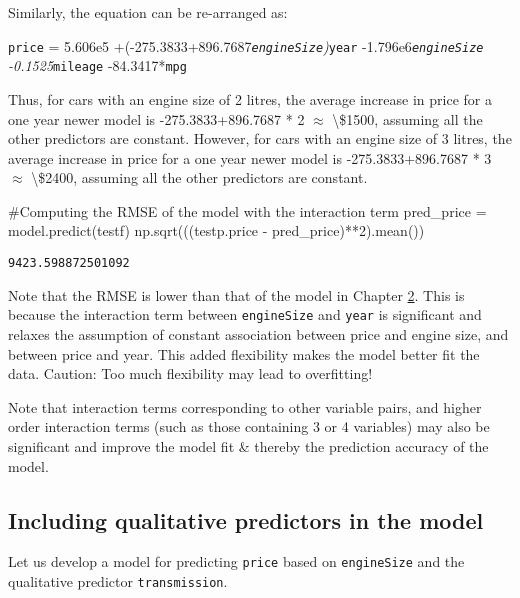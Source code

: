 \documentclass[
  letterpaper,
  DIV=11,
  numbers=noendperiod]{scrreprt}
\newenvironment{Shaded}{\begin{snugshade}}{\end{snugshade}}
\newcommand{\CommentTok}[1]{\textcolor[rgb]{0.37,0.37,0.37}{#1}}
\newcommand{\DecValTok}[1]{\textcolor[rgb]{0.68,0.00,0.00}{#1}}
\newcommand{\NormalTok}[1]{\textcolor[rgb]{0.00,0.23,0.31}{#1}}
\newcommand{\OperatorTok}[1]{\textcolor[rgb]{0.37,0.37,0.37}{#1}}
\begin{document}
Similarly, the equation can be re-arranged as:

\texttt{price} = 5.606e5
+(-275.3833+896.7687\emph{\texttt{engineSize})}\texttt{year}
-1.796e6\emph{\texttt{engineSize} -0.1525}\texttt{mileage}
-84.3417*\texttt{mpg}

Thus, for cars with an engine size of 2 litres, the average increase in
price for a one year newer model is -275.3833+896.7687 * 2 \(\approx\)
\textbackslash\$1500, assuming all the other predictors are constant.
However, for cars with an engine size of 3 litres, the average increase
in price for a one year newer model is -275.3833+896.7687 * 3
\(\approx\) \textbackslash\$2400, assuming all the other predictors are
constant.

\begin{Shaded}
\begin{Highlighting}[]
\CommentTok{\#Computing the RMSE of the model with the interaction term}
\NormalTok{pred\_price }\OperatorTok{=}\NormalTok{ model.predict(testf)}
\NormalTok{np.sqrt(((testp.price }\OperatorTok{{-}}\NormalTok{ pred\_price)}\OperatorTok{**}\DecValTok{2}\NormalTok{).mean())}
\end{Highlighting}
\end{Shaded}

\begin{verbatim}
9423.598872501092
\end{verbatim}

Note that the RMSE is lower than that of the model in Chapter
\href{https://nustat.github.io/STAT303-2-class-notes/Lec2_MultipleLinearRegression.html}{2}.
This is because the interaction term between \texttt{engineSize} and
\texttt{year} is significant and relaxes the assumption of constant
association between price and engine size, and between price and year.
This added flexibility makes the model better fit the data. Caution: Too
much flexibility may lead to overfitting!

Note that interaction terms corresponding to other variable pairs, and
higher order interaction terms (such as those containing 3 or 4
variables) may also be significant and improve the model fit \& thereby
the prediction accuracy of the model.

\subsection{Including qualitative predictors in the
model}\label{including-qualitative-predictors-in-the-model}

Let us develop a model for predicting \texttt{price} based on
\texttt{engineSize} and the qualitative predictor \texttt{transmission}.
\end{document}

